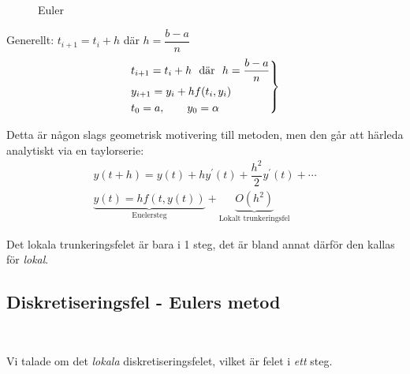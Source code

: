 \begin{figure}[ht]
    \centering
    \caption{Euler}
    \label{fig:euler}
\end{figure}
\par\bigskip
\noindent Generellt: $t_{i+1}=t_i+h$ där $h=\dfrac{b-a}{n}$
\begin{equation*}
  \begin{gathered}
    \begin{rcases*}
      t_{i+1}=t_i+h$ \text{ där } $h=\dfrac{b-a}{n}\\
      y_{i+1}=y_i + hf(t_i,y_i)\\
      t_0=a,\qquad y_0 = \alpha
    \end{rcases*}
  \end{gathered}
\end{equation*}\par
\noindent Detta är någon slags geometrisk motivering till metoden, men den går att härleda analytiskt via en taylorserie:
\begin{equation*}
  \begin{gathered}
    y(t+h)=y(t)+hy^{\prime}(t)+\dfrac{h^2}{2}y^{\prime}(t)+\cdots\\
    \underbrace{y(t)=hf(t,y(t))}_{\text{Euelersteg}}+\underbrace{O(h^2)}_{\text{Lokalt trunkeringsfel}}
  \end{gathered}
\end{equation*}\par
\noindent Det lokala trunkeringsfelet är bara i 1 steg, det är bland annat därför den kallas för \textit{lokal}.
\par\bigskip
\subsection{Diskretiseringsfel - Eulers metod}\hfill\\
\par\bigskip
\noindent Vi talade om det \textit{lokala} diskretiseringsfelet, vilket är felet i \textit{ett} steg. 
